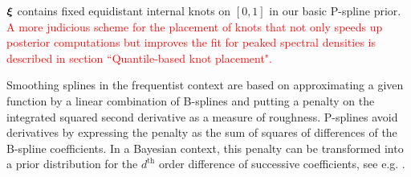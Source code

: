 \documentclass[twocolumn,final]{svjour3}
\newcommand{\bm}[1]{\mbox{\boldmath $#1$}}
\begin{document}
$\bm{\xi}$ contains fixed equidistant internal knots on $[0,1]$ in our basic P-spline prior. \textcolor{red}{A more judicious scheme for the placement  of knots that not only speeds up posterior computations but improves the fit for peaked spectral densities is described in  section ``Quantile-based knot placement".}

Smoothing splines in the frequentist context are based on approximating a given function by a linear combination of B-splines and
putting a penalty on the integrated squared second derivative  as a measure of roughness. P-splines avoid derivatives by expressing the penalty as the sum of squares of differences of the B-spline coefficients.
In a Bayesian context, this penalty can be transformed into a prior distribution for the $d^{\text{th}}$ order difference of successive coefficients, see e.g. \cite{Lang:2004}.
\end{document}
